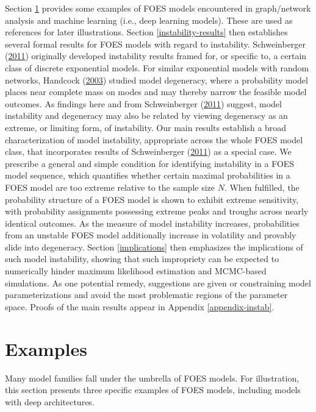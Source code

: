 \documentclass[12pt]{article}
\theoremstyle{definition}
\begin{document}
Section \ref{examples} provides some examples of FOES models encountered
in graph/network analysis and machine learning (i.e., deep learning
models). These are used as references for later illustrations. Section
\ref{instability-results} then establishes several formal results for
FOES models with regard to instability. Schweinberger
(\protect\hyperlink{ref-schweinberger2011instability}{2011}) originally
developed instability results framed for, or specific to, a certain
class of discrete exponential models. For similar exponential models
with random networks, Handcock
(\protect\hyperlink{ref-handcock2003assessing}{2003}) studied model
degeneracy, where a probability model places near complete mass on modes
and may thereby narrow the feasible model outcomes. As findings here and
from Schweinberger
(\protect\hyperlink{ref-schweinberger2011instability}{2011}) suggest,
model instability and degeneracy may also be related by viewing
degeneracy as an extreme, or limiting form, of instability. Our main
results establish a broad characterization of model instability,
appropriate across the whole FOES model class, that incorporates results
of Schweinberger
(\protect\hyperlink{ref-schweinberger2011instability}{2011}) as a
special case. We prescribe a general and simple condition for
identifying instability in a FOES model sequence, which quantifies
whether certain maximal probabilities in a FOES model are too extreme
relative to the sample size \(N\). When fulfilled, the probability
structure of a FOES model is shown to exhibit extreme sensitivity, with
probability assignments possessing extreme peaks and troughs across
nearly identical outcomes. As the measure of model instability
increases, probabilities from an unstable FOES model additionally
increase in volatility and provably slide into degeneracy. Section
\ref{implications} then emphasizes the implications of such model
instability, showing that such impropriety can be expected to
numerically hinder maximum likelihood estimation and MCMC-based
simulations. As one potential remedy, suggestions are given or
constraining model parameterizations and avoid the most problematic
regions of the parameter space. Proofs of the main results appear in
Appendix \ref{appendix-instab}.

\section{Examples}\label{examples}

Many model families fall under the umbrella of FOES models. For
illustration, this section presents three specific examples of FOES
models, including models with deep architectures.
\end{document}
